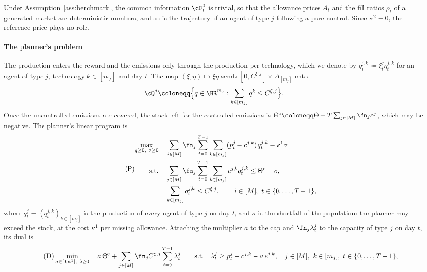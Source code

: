     Under Assumption~\ref{ass:benchmark}, the common information $\cF^0_t$ is trivial, so that the allowance prices $A_t$ and the fill ratios $\rho_t$ of a generated market are deterministic numbers, and so is the trajectory of an agent of type $j$ following a pure control. Since $\kappa^2 = 0$, the reference price plays no role.

    \paragraph{The planner's problem} The production enters the reward and the emissions only through the production per technology, which we denote by $q^{j,k}_t \coloneqq \xi^j_t \eta^{j,k}_t$ for an agent of type $j$, technology $k \in [m_j]$ and day $t$. The map $(\xi, \eta) \mapsto \xi\eta$ sends $[0, C^{\xi,j}] \times \Delta_{[m_j]}$ onto
    $$
        \cQ^j \coloneqq \Big\{ q \in \RR_+^{m_j} : \sum_{k \in [m_j]} q^k \le C^{\xi,j} \Big\}.
    $$
    Once the uncontrolled emissions are covered, the stock left for the controlled emissions is $\Theta^{\mathrm c} \coloneqq \Theta - T \sum_{j \in [M]} \fn_j \varepsilon^j$, which may be negative. The planner's linear program is
    \begin{equation}
        \label{eq:lp_primal}
        \tag{P}
        \begin{aligned}
            \max_{q \ge 0,\ \sigma \ge 0} \quad & \sum_{j \in [M]} \fn_j \sum_{t=0}^{T-1} \sum_{k \in [m_j]} (p^j_t - c^{j,k})\, q^{j,k}_t - \kappa^1 \sigma \\
            \text{s.t.} \quad & \sum_{j \in [M]} \fn_j \sum_{t=0}^{T-1} \sum_{k \in [m_j]} e^{j,k} q^{j,k}_t \le \Theta^{\mathrm c} + \sigma, \\
            & \sum_{k \in [m_j]} q^{j,k}_t \le C^{\xi,j}, \qquad j \in [M],\ t \in \{0, \dots, T-1\},
        \end{aligned}
    \end{equation}
    where $q^{j}_t = (q^{j,k}_t)_{k \in [m_j]}$ is the production of every agent of type $j$ on day $t$, and $\sigma$ is the shortfall of the population: the planner may exceed the stock, at the cost $\kappa^1$ per missing allowance. Attaching the multiplier $a$ to the cap and $\fn_j \lambda^j_t$ to the capacity of type $j$ on day $t$, its dual is
    \begin{equation}
        \label{eq:lp_dual}
        \tag{D}
        \min_{a \in [0, \kappa^1],\ \lambda \ge 0} \quad a\, \Theta^{\mathrm c} + \sum_{j \in [M]} \fn_j C^{\xi,j} \sum_{t=0}^{T-1} \lambda^j_t
        \qquad \text{s.t.} \quad \lambda^j_t \ge p^j_t - c^{j,k} - a\, e^{j,k}, \quad j \in [M],\ k \in [m_j],\ t \in \{0, \dots, T-1\},
    \end{equation}
